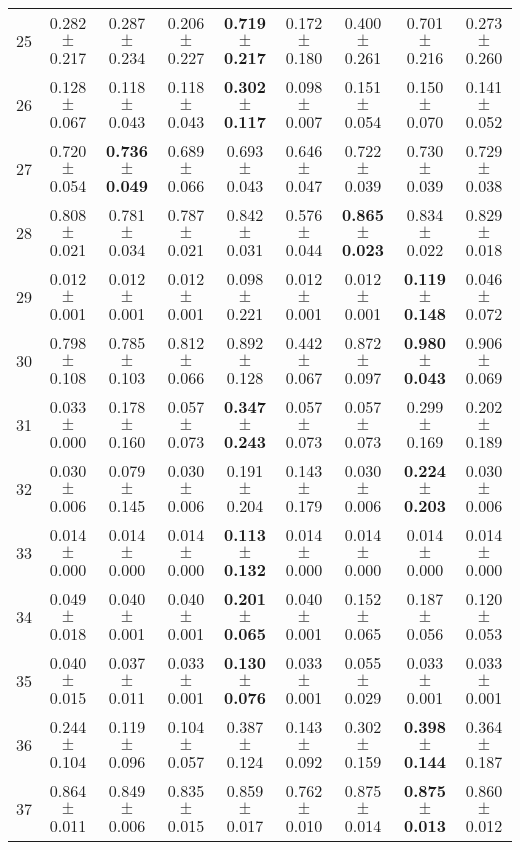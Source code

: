 \begin{table}[!ht]
{\begin{tabular}{r c c c c c c c c}
25 & 0.282 $\pm$ 0.217 & 0.287 $\pm$ 0.234 & 0.206 $\pm$ 0.227 & \textbf{0.719 $\pm$ 0.217} & 0.172 $\pm$ 0.180 & 0.400 $\pm$ 0.261 & 0.701 $\pm$ 0.216 & 0.273 $\pm$ 0.260 \\
26 & 0.128 $\pm$ 0.067 & 0.118 $\pm$ 0.043 & 0.118 $\pm$ 0.043 & \textbf{0.302 $\pm$ 0.117} & 0.098 $\pm$ 0.007 & 0.151 $\pm$ 0.054 & 0.150 $\pm$ 0.070 & 0.141 $\pm$ 0.052 \\
27 & 0.720 $\pm$ 0.054 & \textbf{0.736 $\pm$ 0.049} & 0.689 $\pm$ 0.066 & 0.693 $\pm$ 0.043 & 0.646 $\pm$ 0.047 & 0.722 $\pm$ 0.039 & 0.730 $\pm$ 0.039 & 0.729 $\pm$ 0.038 \\
28 & 0.808 $\pm$ 0.021 & 0.781 $\pm$ 0.034 & 0.787 $\pm$ 0.021 & 0.842 $\pm$ 0.031 & 0.576 $\pm$ 0.044 & \textbf{0.865 $\pm$ 0.023} & 0.834 $\pm$ 0.022 & 0.829 $\pm$ 0.018 \\
29 & 0.012 $\pm$ 0.001 & 0.012 $\pm$ 0.001 & 0.012 $\pm$ 0.001 & 0.098 $\pm$ 0.221 & 0.012 $\pm$ 0.001 & 0.012 $\pm$ 0.001 & \textbf{0.119 $\pm$ 0.148} & 0.046 $\pm$ 0.072 \\
30 & 0.798 $\pm$ 0.108 & 0.785 $\pm$ 0.103 & 0.812 $\pm$ 0.066 & 0.892 $\pm$ 0.128 & 0.442 $\pm$ 0.067 & 0.872 $\pm$ 0.097 & \textbf{0.980 $\pm$ 0.043} & 0.906 $\pm$ 0.069 \\
31 & 0.033 $\pm$ 0.000 & 0.178 $\pm$ 0.160 & 0.057 $\pm$ 0.073 & \textbf{0.347 $\pm$ 0.243} & 0.057 $\pm$ 0.073 & 0.057 $\pm$ 0.073 & 0.299 $\pm$ 0.169 & 0.202 $\pm$ 0.189 \\
32 & 0.030 $\pm$ 0.006 & 0.079 $\pm$ 0.145 & 0.030 $\pm$ 0.006 & 0.191 $\pm$ 0.204 & 0.143 $\pm$ 0.179 & 0.030 $\pm$ 0.006 & \textbf{0.224 $\pm$ 0.203} & 0.030 $\pm$ 0.006 \\
33 & 0.014 $\pm$ 0.000 & 0.014 $\pm$ 0.000 & 0.014 $\pm$ 0.000 & \textbf{0.113 $\pm$ 0.132} & 0.014 $\pm$ 0.000 & 0.014 $\pm$ 0.000 & 0.014 $\pm$ 0.000 & 0.014 $\pm$ 0.000 \\
34 & 0.049 $\pm$ 0.018 & 0.040 $\pm$ 0.001 & 0.040 $\pm$ 0.001 & \textbf{0.201 $\pm$ 0.065} & 0.040 $\pm$ 0.001 & 0.152 $\pm$ 0.065 & 0.187 $\pm$ 0.056 & 0.120 $\pm$ 0.053 \\
35 & 0.040 $\pm$ 0.015 & 0.037 $\pm$ 0.011 & 0.033 $\pm$ 0.001 & \textbf{0.130 $\pm$ 0.076} & 0.033 $\pm$ 0.001 & 0.055 $\pm$ 0.029 & 0.033 $\pm$ 0.001 & 0.033 $\pm$ 0.001 \\
36 & 0.244 $\pm$ 0.104 & 0.119 $\pm$ 0.096 & 0.104 $\pm$ 0.057 & 0.387 $\pm$ 0.124 & 0.143 $\pm$ 0.092 & 0.302 $\pm$ 0.159 & \textbf{0.398 $\pm$ 0.144} & 0.364 $\pm$ 0.187 \\
37 & 0.864 $\pm$ 0.011 & 0.849 $\pm$ 0.006 & 0.835 $\pm$ 0.015 & 0.859 $\pm$ 0.017 & 0.762 $\pm$ 0.010 & 0.875 $\pm$ 0.014 & \textbf{0.875 $\pm$ 0.013} & 0.860 $\pm$ 0.012 \\

\end{tabular}}
\end{table}
